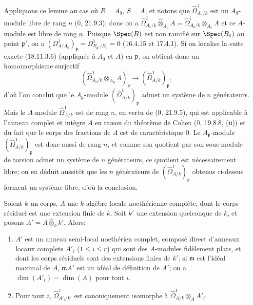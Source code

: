 Appliquons ce lemme au cas où $R=A_0$, $S=A$, et notons que $\hat{\Omega}^1_{A_0/k}$ est un $A_0$-module libre de rang $n$ (0, 21.9.3); donc on a $\hat{\Omega}^1_{A_0/k}\widehat{\otimes}_{A_0}A=\hat{\Omega}^1_{A_0/k}\otimes_{A_0}A$ et ce $A$-module est libre de rang $n$. Puisque $\Spec(B)$ est non ramifié sur $\Spec(B_0)$ au point $\mathfrak p'$, on a $(\Omega^1_{A/A_0})_{\mathfrak p}=\Omega^1_{B_{\mathfrak p'}/B_0}=0$ (16.4.15 et 17.4.1). Si on localise la suite exacte (18.11.3.6) (appliquée à $A_0$ et $A$) en $\mathfrak p$, on obtient donc un homomorphisme surjectif
\[
  (\hat{\Omega}^1_{A_0/k}\otimes_{A_0}A)_{\mathfrak p}\longrightarrow(\hat{\Omega}^1_{A/k})_{\mathfrak p},
\]
d'où l'on conclut que le $A_{\mathfrak p}$-module $(\hat{\Omega}^1_{A/k})_{\mathfrak p}$ admet un système de $n$ générateurs. Mais le $A$-module $\hat{\Omega}^1_{A/k}$ est de rang $n$, en vertu de (0, 21.9.5), qui est applicable à l'anneau complet et intègre $A$ en raison du théorème de Cohen (0, 19.8.8, (ii)) et du fait que le corps des fractions de $A$ est de caractéristique 0. Le $A_{\mathfrak p}$-module $(\hat{\Omega}^1_{A/k})_{\mathfrak p}$ est donc aussi de rang $n$, et comme son quotient par son sous-module de torsion admet un système de $n$ générateurs, ce quotient est nécessairement libre; on en déduit aussitôt que les $n$ générateurs de $(\hat{\Omega}^1_{A/k})_{\mathfrak p}$ obtenus ci-dessus forment un système libre, d'où la conclusion.

\begin{lemma}[18.11.4]
\label{IV.18.11.4}
Soient $k$ un corps, $A$ une $k$-algèbre locale noethérienne complète, dont le corps résiduel est une extension finie de $k$. Soit $k'$ une extension quelconque de $k$, et posons $A'=A\widehat{\otimes}_k k'$. Alors:
\begin{enumerate}
  \item[(i)] $A'$ est un anneau semi-local noethérien complet, composé direct d'anneaux locaux complets $A'_i$ ($1\leq i\leq r$) qui sont des $A$-modules fidèlement plats, et dont les corps résiduels sont des extensions finies de $k'$; si $\mathfrak m$ est l'idéal maximal de $A$, $\mathfrak mA'$ est un idéal de définition de $A'$; on a $\dim(A'_i)=\dim(A)$ pour tout $i$.
  \item[(ii)] Pour tout $i$, $\hat{\Omega}^1_{A'_i/k'}$ est canoniquement isomorphe à $\hat{\Omega}^1_{A/k}\otimes_A A'_i$.
\end{enumerate}
\end{lemma}

